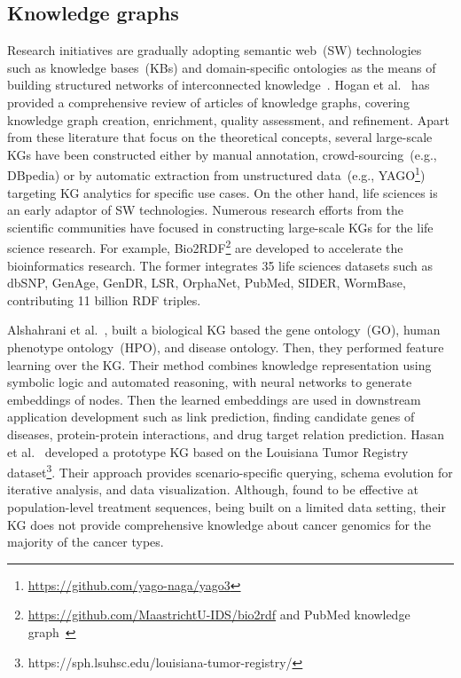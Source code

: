 \subsection{Knowledge graphs}
Research initiatives are gradually adopting semantic web~(SW) technologies~\cite{karim2018improving} such as knowledge bases~(KBs) and domain-specific ontologies as the means of building structured networks of interconnected knowledge~\cite{futia2020integration}. Hogan et al.~\cite{hogan2020knowledge} has provided a comprehensive review of articles of knowledge graphs, covering knowledge graph creation, enrichment, quality assessment, and refinement. Apart from these literature that focus on the theoretical concepts, several large-scale KGs have been constructed either by manual annotation, crowd-sourcing~(e.g., DBpedia) or by automatic extraction from unstructured data~(e.g., YAGO\footnote{\url{https://github.com/yago-naga/yago3}})~\cite{wang2015explicit} targeting KG analytics for specific use cases. 
On the other hand, life sciences is an early adaptor of SW technologies. Numerous research efforts from the scientific communities have focused in constructing large-scale KGs for the life science research. For example, Bio2RDF\footnote{\url{https://github.com/MaastrichtU-IDS/bio2rdf} and PubMed knowledge graph~\cite{xu2020building}} are developed to accelerate the bioinformatics research. The former integrates 35 life sciences datasets such as dbSNP, GenAge, GenDR, LSR, OrphaNet, PubMed, SIDER, WormBase, contributing 11 billion RDF triples. 

\hspace*{3.5mm} Alshahrani et al.~\cite{alshahrani2017neuro}, built a biological KG  based the gene ontology~(GO), human phenotype ontology~(HPO), and disease ontology. Then, they performed feature learning over the KG. Their method combines knowledge representation using symbolic logic and automated reasoning, with neural networks to generate embeddings of nodes. Then the learned embeddings are used in downstream application development such as link prediction, finding candidate genes of diseases, protein-protein interactions, and drug target relation prediction. Hasan et al.~\cite{hasan2020knowledge} developed a prototype KG based on the Louisiana Tumor Registry dataset\footnote{https://sph.lsuhsc.edu/louisiana-tumor-registry/}. Their approach provides scenario-specific querying, schema evolution for iterative analysis, and data visualization. Although, found to be effective at population-level treatment sequences, being built on a limited data setting, their KG does not provide comprehensive knowledge about cancer genomics for the majority of the cancer types.


